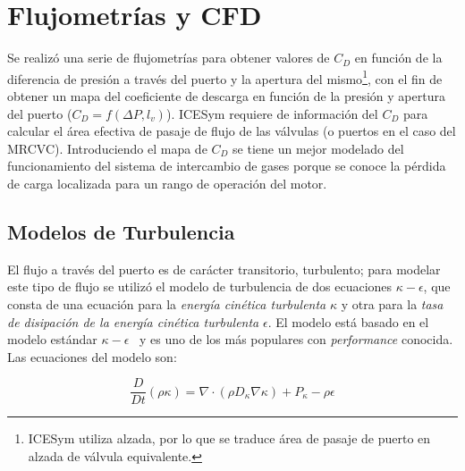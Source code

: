\section{Flujometrías y CFD}
%
Se realizó una serie de flujometrías para obtener valores de $C_{D}$ en función
de la diferencia de presión a través del puerto y la apertura del
mismo\footnote{ICESym utiliza alzada, por lo que se traduce área de pasaje de
puerto en alzada de válvula equivalente.}, con el fin de obtener un mapa del
coeficiente de descarga en función de la presión y apertura del puerto
($C_{D} = f(\Delta P,l_v)$).
%
ICESym requiere de información del $C_{D}$ para calcular el área efectiva
de pasaje de flujo de las válvulas (o puertos en el caso del MRCVC).
%
Introduciendo el mapa de $C_{D}$ se tiene un mejor modelado del funcionamiento
del sistema de intercambio de gases porque se conoce la pérdida de carga
localizada para un rango de operación del motor.



\subsection{Modelos de Turbulencia}
%
El flujo a través del puerto es de carácter transitorio, turbulento; para
modelar este tipo de flujo se utilizó el modelo de turbulencia de dos ecuaciones
\emph{$\kappa-\epsilon$}\parencite{wilcox}, que consta de una ecuación para la
\emph{energía cinética turbulenta} $\kappa$ y otra para la \emph{tasa de
disipación de la energía cinética turbulenta} $\epsilon$.
%
El modelo está basado en el modelo estándar
$\kappa-\epsilon$~\parencite{launderSpalding} y es uno de los más populares con
\emph{performance} conocida.
%
Las ecuaciones del modelo son:

\begin{equation}\label{eq:k}
  \frac{D}{Dt}(\rho \kappa) = \nabla \cdot (\rho D_{\kappa}\nabla \kappa) + P_{\kappa} - \rho \epsilon
\end{equation}


